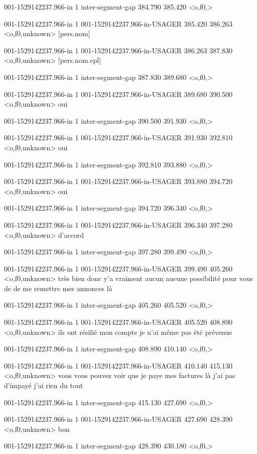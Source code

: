001-1529142237.966-in 1 inter-segment-gap 384.790 385.420 <o,f0,>

001-1529142237.966-in 1 001-1529142237.966-in-USAGER 385.420 386.263 <o,f0,unknown> [pers.nom]

001-1529142237.966-in 1 001-1529142237.966-in-USAGER 386.263 387.830 <o,f0,unknown> [pers.nom.epl]

001-1529142237.966-in 1 inter-segment-gap 387.830 389.680 <o,f0,>

001-1529142237.966-in 1 001-1529142237.966-in-USAGER 389.680 390.500 <o,f0,unknown> oui

001-1529142237.966-in 1 inter-segment-gap 390.500 391.930 <o,f0,>

001-1529142237.966-in 1 001-1529142237.966-in-USAGER 391.930 392.810 <o,f0,unknown> oui

001-1529142237.966-in 1 inter-segment-gap 392.810 393.880 <o,f0,>

001-1529142237.966-in 1 001-1529142237.966-in-USAGER 393.880 394.720 <o,f0,unknown> oui

001-1529142237.966-in 1 inter-segment-gap 394.720 396.340 <o,f0,>

001-1529142237.966-in 1 001-1529142237.966-in-USAGER 396.340 397.280 <o,f0,unknown> d'accord

001-1529142237.966-in 1 inter-segment-gap 397.280 399.490 <o,f0,>

001-1529142237.966-in 1 001-1529142237.966-in-USAGER 399.490 405.260 <o,f0,unknown> très bien donc y'a vraiment aucun aucune possibilité pour vous de de me remettre mes annonces là

001-1529142237.966-in 1 inter-segment-gap 405.260 405.520 <o,f0,>

001-1529142237.966-in 1 001-1529142237.966-in-USAGER 405.520 408.890 <o,f0,unknown> ils ont résilié mon compte je n'ai même pas été prévenue

001-1529142237.966-in 1 inter-segment-gap 408.890 410.140 <o,f0,>

001-1529142237.966-in 1 001-1529142237.966-in-USAGER 410.140 415.130 <o,f0,unknown> vous vous pouvez voir que je paye mes factures là j'ai pas d'impayé j'ai rien du tout

001-1529142237.966-in 1 inter-segment-gap 415.130 427.690 <o,f0,>

001-1529142237.966-in 1 001-1529142237.966-in-USAGER 427.690 428.390 <o,f0,unknown> bon

001-1529142237.966-in 1 inter-segment-gap 428.390 430.180 <o,f0,>

